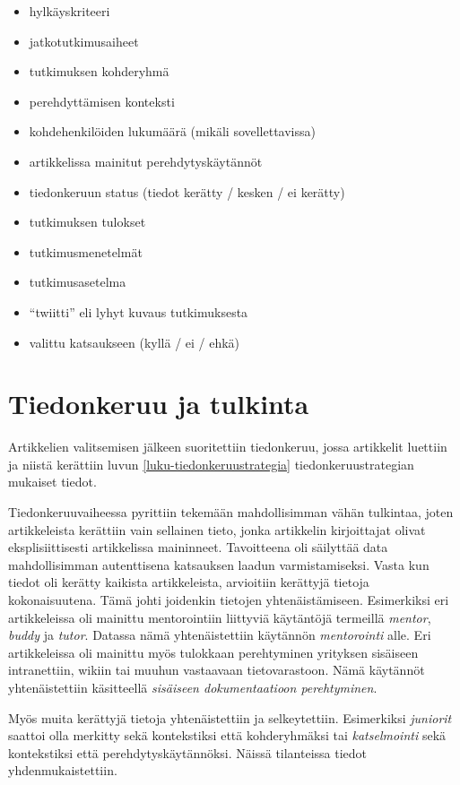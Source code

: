 \documentclass[utf8]{gradu3}
\begin{document}
\begin{itemize}
    \item hylkäyskriteeri
    \item jatkotutkimusaiheet
    \item tutkimuksen kohderyhmä
    \item perehdyttämisen konteksti
    \item kohdehenkilöiden lukumäärä (mikäli sovellettavissa)
    \item artikkelissa mainitut perehdytyskäytännöt
    \item tiedonkeruun status (tiedot kerätty / kesken / ei kerätty)
    \item tutkimuksen tulokset
    \item tutkimusmenetelmät
    \item tutkimusasetelma
    \item ``twiitti'' eli lyhyt kuvaus tutkimuksesta
    \item valittu katsaukseen (kyllä / ei / ehkä)
\end{itemize}

\section{Tiedonkeruu ja tulkinta}

Artikkelien valitsemisen jälkeen suoritettiin tiedonkeruu, jossa artikkelit luettiin ja niistä kerättiin luvun \ref{luku-tiedonkeruustrategia} tiedonkeruustrategian mukaiset tiedot.

Tiedonkeruuvaiheessa pyrittiin tekemään mahdollisimman vähän tulkintaa, joten artikkeleista kerättiin vain sellainen tieto, jonka artikkelin kirjoittajat olivat eksplisiittisesti artikkelissa maininneet. Tavoitteena oli säilyttää data mahdollisimman autenttisena katsauksen laadun varmistamiseksi. Vasta kun tiedot oli kerätty kaikista artikkeleista, arvioitiin kerättyjä tietoja kokonaisuutena. Tämä johti joidenkin tietojen yhtenäistämiseen. Esimerkiksi eri artikkeleissa oli mainittu mentorointiin liittyviä käytäntöjä termeillä \textit{mentor}, \textit{buddy} ja \textit{tutor}. Datassa nämä yhtenäistettiin käytännön \textit{mentorointi} alle. Eri artikkeleissa oli mainittu myös tulokkaan perehtyminen yrityksen sisäiseen intranettiin, wikiin tai muuhun vastaavaan tietovarastoon. Nämä käytännöt yhtenäistettiin käsitteellä \textit{sisäiseen dokumentaatioon perehtyminen}.

Myös muita kerättyjä tietoja yhtenäistettiin ja selkeytettiin. Esimerkiksi \textit{juniorit} saattoi olla merkitty sekä kontekstiksi että kohderyhmäksi tai \textit{katselmointi} sekä kontekstiksi että perehdytyskäytännöksi. Näissä tilanteissa tiedot yhdenmukaistettiin.
\end{document}
